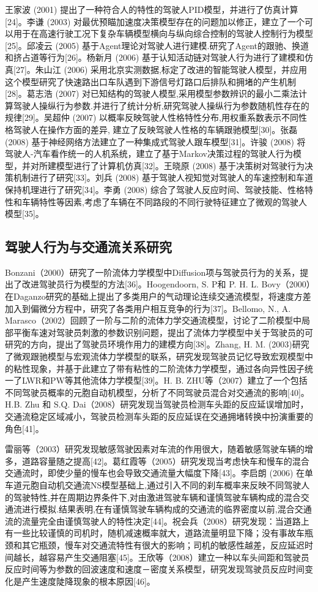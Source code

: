 王家波 (2001) 提出了一种符合人的特性的驾驶人PID模型，并进行了仿真计算[24]。李谦 (2003) 对最优预瞄加速度决策模型存在的问题加以修正，建立了一个可以用于在高速行驶工况下复杂车辆模型横向与纵向综合控制的驾驶人控制行为模型[25]。邱凌云 (2005) 基于Agent理论对驾驶人进行建模.研究了Agent的跟驰、换道和挤占道等行为[26]。杨新月 (2006) 基于认知活动链对驾驶人行为进行了建模和仿真[27]。朱山江 (2006) 采用北京实测数据,标定了改进的智能驾驶人模型，并应用这个模型研究了快速路出口车队遇到下游信号灯路口后排队和拥堵的产生机制[28]。葛志浩 (2007) 对已知结构的驾驶人模型,采用模型参数辨识的最小二乘法计算驾驶人操纵行为参数.并进行了统计分析,研究驾驶人操纵行为参数随机性存在的规律[29]。吴超仲 (2007) 以概率反映驾驶人性格特性分布,用权重系数表示不同性格驾驶人在操作方面的差异, 建立了反映驾驶人性格的车辆跟驰模型[30]。张磊 (2008) 基于神经网络方法建立了一种集成式驾驶人跟车模型[31]。许骏 (2008) 将驾驶人-汽车看作统一的人机系统，建立了基于Markov决策过程的驾驶人行为模型，并对所建模型进行了计算机仿真[32]。王晓原 (2008) 基于决策树对驾驶行为决策机制进行了研究[33]。刘兵 (2008) 基于驾驶人视知觉对驾驶人的车速控制和车道保持机理进行了研究[34]。李勇 (2008) 综合了驾驶人反应时间、驾驶技能、性格特性和车辆特性等因素,考虑了车辆在不同路段的不同行驶特征建立了微观的驾驶人模型[35]。


\subsection{驾驶人行为与交通流关系研究}

Bonzani（2000）研究了一阶流体力学模型中Diffusion项与驾驶员行为的关系，提出了改进驾驶员行为模型的方法[36]。Hoogendoorn, S. P和 P. H. L. Bovy（2000）在Daganzo研究的基础上提出了多类用户的气动理论连续交通流模型，将速度方差加入到偏微分方程中，研究了各类用户相互竞争的行为[37]。Bellomo, N., A. Marasco（2002）回顾了一阶与二阶的流体力学交通流模型，讨论了二阶模型中局部平衡车速对驾驶员刺激的参数识别问题，提出了流体力学模型中关于驾驶员的可研究的方向，提出了驾驶员环境作用力的建模方向[38]。Zhang, H. M. (2003)研究了微观跟驰模型与宏观流体力学模型的联系，研究发现驾驶员记忆导致宏观模型中的粘性现象，并基于此建立了带有粘性的二阶流体力学模型，通过各向异性因子统一了LWR和PW等其他流体力学模型[39]。H. B. ZHU等（2007）建立了一个包括不同驾驶员概率的元胞自动机模型，分析了不同驾驶员混合对交通流的影响[40]。H.B. Zhu 和 S.Q. Dai（2008）研究发现当驾驶员检测车头距的反应延误增加时，交通流稳定区域减小，驾驶员检测车头距的反应延误在交通拥堵转换中扮演重要的角色[41]。

雷丽等（2003）研究发现敏感驾驶因素对车流的作用很大，随着敏感驾驶车辆的增多，道路容量随之提高[42]。葛红霞等（2005）研究发现当考虑快车和慢车的混合交通流时，即使少量的慢车也会导致交通流量大幅度下降[43]。李启朗 (2006) 在单车道元胞自动机交通流NS模型基础上,通过引入不同的刹车概率来反映不同驾驶人的驾驶特性,并在周期边界条件下,对由激进驾驶车辆和谨慎驾驶车辆构成的混合交通流进行模拟.结果表明,在有谨慎驾驶车辆构成的交通流的临界密度以前,混合交通流的流量完全由谨慎驾驶人的特性决定[44]。祝会兵（2008）研究发现：当道路上有一些比较谨慎的司机时，随机减速概率就大，道路流量明显下降；没有事故车瓶颈和其它瓶颈，慢车对交通流特性有很大的影响；司机的敏感性越差，反应延迟时间越长，越容易产生交通阻塞[45]。王欣等（2008）建立一种以车头间距和驾驶员反应时间等为参数的回波速度和速度－密度关系模型，研究发现驾驶员反应时间变化是产生速度陡降现象的根本原因[46]。


